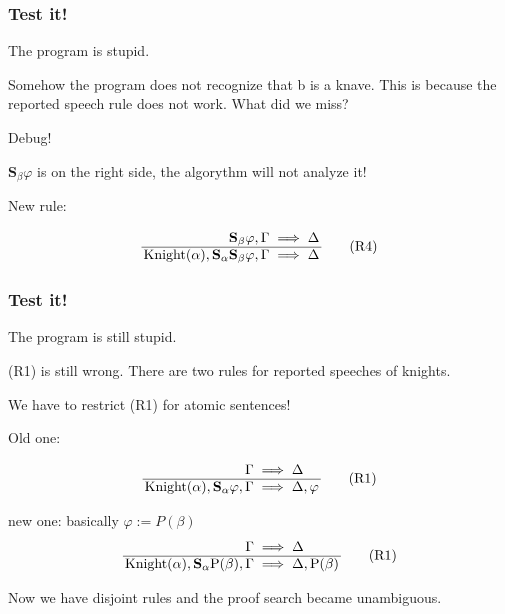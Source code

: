 \documentclass[xcolor=x11names]{beamer}
\newcommand{\says}[1]{\mathbf{S}_{#1}}
\newcommand{\isa}[2]{\mathrm{#2}(#1)}
\begin{document}
\begin{frame}
  \frametitle{Test it!}


  \pause

   \centering The program is stupid.

   \pause

Somehow the program does not recognize that b is a knave. This is because the reported speech rule does not work. What did we miss?

\pause

Debug!

\pause

$\says \beta \varphi$ is on the right side, the algorythm will not analyze it!


\pause
New rule:

    {\Large \[ \arraycolsep = 0.5mm \begin{array}{rcl}
      \says\beta \varphi, \Gamma &\implies& \Delta
    \\ \hline
        \isa{\alpha}{Knight}, \says \alpha \says\beta\varphi ,\Gamma&\implies& \Delta
    \end{array}\tag{R4}\]}

\end{frame}

\begin{frame}
  \frametitle{Test it!}

  \pause

   \centering The program is still stupid.

   \pause

(R1) is still wrong. There are two rules for reported speeches of knights.

\pause
We have to restrict (R1) for atomic sentences!

Old one:

    {\Large \[ \arraycolsep = 0.5mm \begin{array}{rcl}
       \Gamma &\implies& \Delta
    \\ \hline
        \isa{\alpha}{Knight}, \says \alpha \varphi,\Gamma&\implies& \Delta, \varphi
    \end{array}\tag{R1}\]}

\pause

new one: basically $\varphi := P(\beta)$
    {\Large \[ \arraycolsep = 0.5mm \begin{array}{rcl}
       \Gamma &\implies& \Delta
    \\ \hline
        \isa{\alpha}{Knight}, \says \alpha \isa{\beta}{P},\Gamma&\implies& \Delta, \isa{\beta}{P}
    \end{array}\tag{R1}\]}

Now we have disjoint rules and the proof search became unambiguous.

\end{frame}
\end{document}
